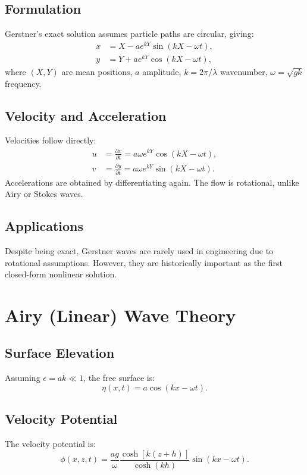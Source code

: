 \documentclass[11pt,a4paper]{article}
\begin{document}
\subsection{Formulation}
Gerstner’s exact solution assumes particle paths are circular, giving:
\begin{align}
x &= X - a e^{kY}\sin(kX - \omega t), \\
y &= Y + a e^{kY}\cos(kX - \omega t),
\end{align}
where $(X,Y)$ are mean positions, $a$ amplitude, $k=2\pi/\lambda$ wavenumber, $\omega=\sqrt{gk}$ frequency.

\subsection{Velocity and Acceleration}
Velocities follow directly:
\begin{align}
u &= \frac{\partial x}{\partial t} = a \omega e^{kY}\cos(kX - \omega t), \\
v &= \frac{\partial y}{\partial t} = a \omega e^{kY}\sin(kX - \omega t).
\end{align}
Accelerations are obtained by differentiating again. The flow is rotational, unlike Airy or Stokes waves.

\subsection{Applications}
Despite being exact, Gerstner waves are rarely used in engineering due to rotational assumptions. However, they are historically important as the first closed-form nonlinear solution.

\section{Airy (Linear) Wave Theory}
\subsection{Surface Elevation}
Assuming $\epsilon = ak \ll 1$, the free surface is:
\begin{equation}
\eta(x,t) = a \cos(kx - \omega t).
\end{equation}
\subsection{Velocity Potential}
The velocity potential is:
\begin{equation}
\phi(x,z,t) = \frac{a g}{\omega}\frac{\cosh[k(z+h)]}{\cosh(kh)}\sin(kx - \omega t).
\end{equation}
\end{document}
